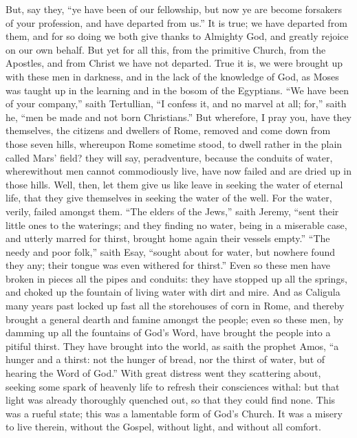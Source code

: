 But, say they, “ye have been of our fellowship, but now ye
are become forsakers of your profession, and have departed from us.”
It is true; we have departed from them, and for so doing we both give
thanks to Almighty God, and greatly rejoice on our own behalf.
But yet for all this, from the primitive Church, from the Apostles,
and from Christ we have not departed. True it is, we were brought
up with these men in darkness, and in
the lack of the knowledge of God, as Moses was taught up in the learning
and in the bosom of the Egyptians. “We have been of your
company,” saith Tertullian, “I confess it, and no marvel
at all; for,” saith he, “men be made and not born Christians.”
But wherefore, I pray you, have they themselves, the citizens and dwellers
of Rome, removed and come down from those seven hills, whereupon Rome
sometime stood, to dwell rather in the plain called Mars’ field?
they will say, peradventure, because the conduits of water, wherewithout
men cannot commodiously live, have now failed and are dried up in those
hills. Well, then, let them give us like leave in seeking the
water of eternal life, that they give themselves in seeking the water
of the well. For the water, verily, failed amongst them.
“The elders of the Jews,” saith Jeremy, “sent their
little ones to the waterings; and they finding no water, being in a
miserable case, and utterly marred for thirst, brought home again their
vessels empty.” “The needy and poor folk,” saith
Esay, “sought about for water, but nowhere found they any; their
tongue was even withered for thirst.” Even so these men
have broken in pieces all the pipes and conduits: they have stopped
up all the springs, and choked up the
fountain of living water with dirt and mire. And as Caligula many
years past locked up fast all the storehouses of corn in Rome, and thereby
brought a general dearth and famine amongst the people; even so these
men, by damming up all the fountains of God’s Word, have brought
the people into a pitiful thirst. They have brought into the world,
as saith the prophet Amos, “a hunger and a thirst: not the hunger
of bread, nor the thirst of water, but of hearing the Word of God.”
With great distress went they scattering about, seeking some spark of
heavenly life to refresh their consciences withal: but that light was
already thoroughly quenched out, so that they could find none.
This was a rueful state; this was a lamentable form of God’s Church.
It was a misery to live therein, without the Gospel, without light,
and without all comfort.

